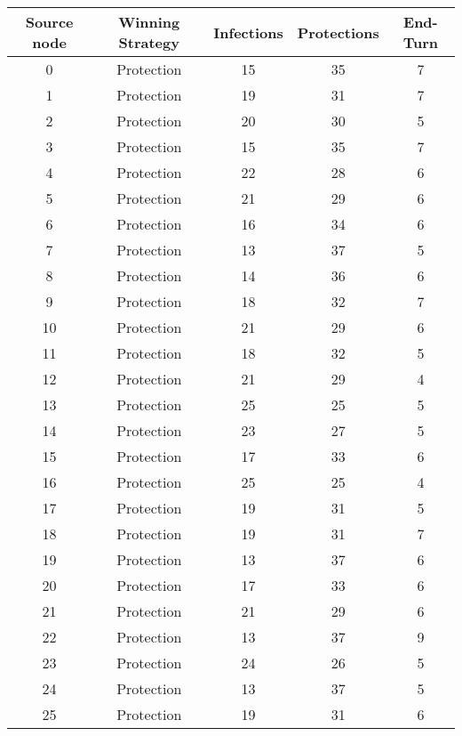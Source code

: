 \documentclass[results.tex]{subfiles}
\begin{document}
\begin{center}
  \begin{tabular}{| c || c | c | c | c |}
    \hline
    {\bfseries Source node} & {\bfseries Winning Strategy} & {\bfseries Infections} & {\bfseries Protections} & {\bfseries End-Turn} \\  %
    \hline\hline
    0 & Protection & 15 & 35 & 7 \\ 
    \hline
    1 & Protection & 19 & 31 & 7 \\ 
    \hline
    2 & Protection & 20 & 30 & 5 \\ 
    \hline
    3 & Protection & 15 & 35 & 7 \\ 
    \hline
    4 & Protection & 22 & 28 & 6 \\ 
    \hline
    5 & Protection & 21 & 29 & 6 \\ 
    \hline
    6 & Protection & 16 & 34 & 6 \\ 
    \hline
    7 & Protection & 13 & 37 & 5 \\ 
    \hline
    8 & Protection & 14 & 36 & 6 \\ 
    \hline
    9 & Protection & 18 & 32 & 7 \\ 
    \hline
    10 & Protection & 21 & 29 & 6 \\ 
    \hline
    11 & Protection & 18 & 32 & 5 \\ 
    \hline
    12 & Protection & 21 & 29 & 4 \\ 
    \hline
    13 & Protection & 25 & 25 & 5 \\ 
    \hline
    14 & Protection & 23 & 27 & 5 \\ 
    \hline
    15 & Protection & 17 & 33 & 6 \\ 
    \hline
    16 & Protection & 25 & 25 & 4 \\ 
    \hline
    17 & Protection & 19 & 31 & 5 \\ 
    \hline
    18 & Protection & 19 & 31 & 7 \\ 
    \hline
    19 & Protection & 13 & 37 & 6 \\ 
    \hline
    20 & Protection & 17 & 33 & 6 \\ 
    \hline
    21 & Protection & 21 & 29 & 6 \\ 
    \hline
    22 & Protection & 13 & 37 & 9 \\ 
    \hline
    23 & Protection & 24 & 26 & 5 \\ 
    \hline
    24 & Protection & 13 & 37 & 5 \\ 
    \hline
    25 & Protection & 19 & 31 & 6 \\ 

\end{tabular}
\end{center}
\end{document}
